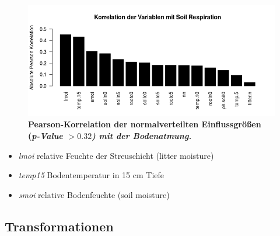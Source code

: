 \begin{figure}
	\centering
	\includegraphics[width=\textwidth]{fig/model/correlation-pearson-normal.png}
	\caption{\bf{Pearson-Korrelation} der normalverteilten Einflussgrößen (\it{p-Value} $> 0.32$) mit der Bodenatmung.}
    \label{fig:pearson}
\end{figure}

\begin{itemize}
\item
  \emph{lmoi} relative Feuchte der Streuschicht (litter moisture)
\item
  \emph{temp15} Bodentemperatur in 15 cm Tiefe
\item
  \emph{smoi} relative Bodenfeuchte (soil moisture)
\end{itemize}

\subsection{Transformationen}

